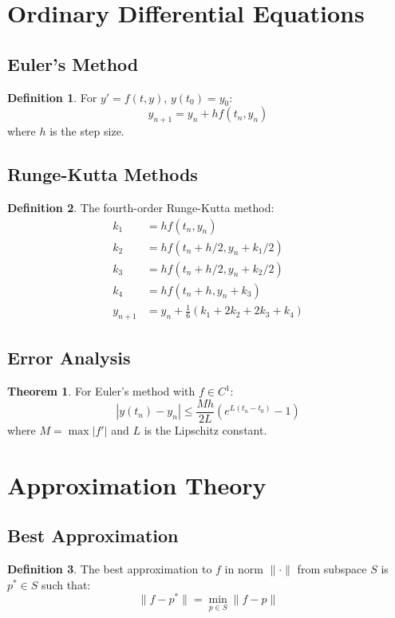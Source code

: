 \documentclass[11pt]{article}
\theoremstyle{definition}
\newtheorem{definition}{Definition}[section]
\newtheorem{theorem}{Theorem}[section]
\begin{document}
\section{Ordinary Differential Equations}

\subsection{Euler's Method}
\begin{definition}
For $y' = f(t,y)$, $y(t_0) = y_0$:
$$y_{n+1} = y_n + h f(t_n, y_n)$$
where $h$ is the step size.
\end{definition}

\subsection{Runge-Kutta Methods}
\begin{definition}
The fourth-order Runge-Kutta method:
\begin{align}
k_1 &= h f(t_n, y_n) \\
k_2 &= h f(t_n + h/2, y_n + k_1/2) \\
k_3 &= h f(t_n + h/2, y_n + k_2/2) \\
k_4 &= h f(t_n + h, y_n + k_3) \\
y_{n+1} &= y_n + \frac{1}{6}(k_1 + 2k_2 + 2k_3 + k_4)
\end{align}
\end{definition}

\subsection{Error Analysis}
\begin{theorem}
For Euler's method with $f \in C^1$:
$$|y(t_n) - y_n| \leq \frac{Mh}{2L}(e^{L(t_n-t_0)} - 1)$$
where $M = \max |f'|$ and $L$ is the Lipschitz constant.
\end{theorem}

\section{Approximation Theory}

\subsection{Best Approximation}
\begin{definition}
The best approximation to $f$ in norm $\|\cdot\|$ from subspace $S$ is $p^* \in S$ such that:
$$\|f - p^*\| = \min_{p \in S} \|f - p\|$$
\end{definition}
\end{document}
